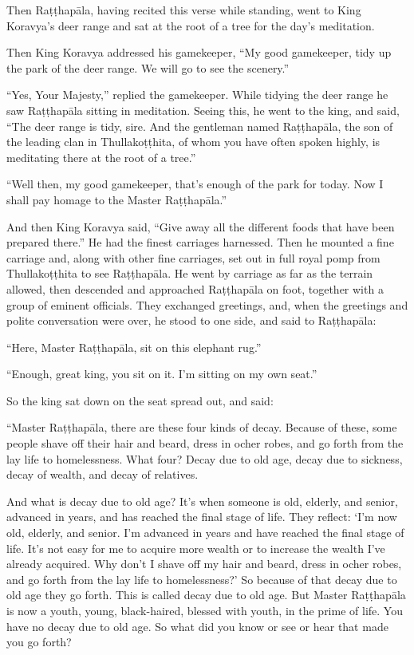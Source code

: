 \documentclass[12pt,openany]{book}%
\begin{document}
Then \textsanskrit{Raṭṭhapāla}, having recited this verse while standing, went to King Koravya’s deer range and sat at the root of a tree for the day’s meditation. 

Then King Koravya addressed his gamekeeper, “My good gamekeeper, tidy up the park of the deer range. We will go to see the scenery.” 

“Yes, Your Majesty,” replied the gamekeeper. While tidying the deer range he saw \textsanskrit{Raṭṭhapāla} sitting in meditation. Seeing this, he went to the king, and said, “The deer range is tidy, sire. And the gentleman named \textsanskrit{Raṭṭhapāla}, the son of the leading clan in \textsanskrit{Thullakoṭṭhita}, of whom you have often spoken highly, is meditating there at the root of a tree.” 

“Well then, my good gamekeeper, that’s enough of the park for today. Now I shall pay homage to the Master \textsanskrit{Raṭṭhapāla}.” 

And then King Koravya said, “Give away all the different foods that have been prepared there.” He had the finest carriages harnessed. Then he mounted a fine carriage and, along with other fine carriages, set out in full royal pomp from \textsanskrit{Thullakoṭṭhita} to see \textsanskrit{Raṭṭhapāla}. He went by carriage as far as the terrain allowed, then descended and approached \textsanskrit{Raṭṭhapāla} on foot, together with a group of eminent officials. They exchanged greetings, and, when the greetings and polite conversation were over, he stood to one side, and said to \textsanskrit{Raṭṭhapāla}: 

“Here, Master \textsanskrit{Raṭṭhapāla}, sit on this elephant rug.” 

“Enough, great king, you sit on it. I’m sitting on my own seat.” 

So the king sat down on the seat spread out, and said: 

“Master \textsanskrit{Raṭṭhapāla}, there are these four kinds of decay. Because of these, some people shave off their hair and beard, dress in ocher robes, and go forth from the lay life to homelessness. What four? Decay due to old age, decay due to sickness, decay of wealth, and decay of relatives. 

And what is decay due to old age? It’s when someone is old, elderly, and senior, advanced in years, and has reached the final stage of life. They reflect: ‘I’m now old, elderly, and senior. I’m advanced in years and have reached the final stage of life. It’s not easy for me to acquire more wealth or to increase the wealth I’ve already acquired. Why don’t I shave off my hair and beard, dress in ocher robes, and go forth from the lay life to homelessness?’ So because of that decay due to old age they go forth. This is called decay due to old age. But Master \textsanskrit{Raṭṭhapāla} is now a youth, young, black-haired, blessed with youth, in the prime of life. You have no decay due to old age. So what did you know or see or hear that made you go forth? 
\end{document}
